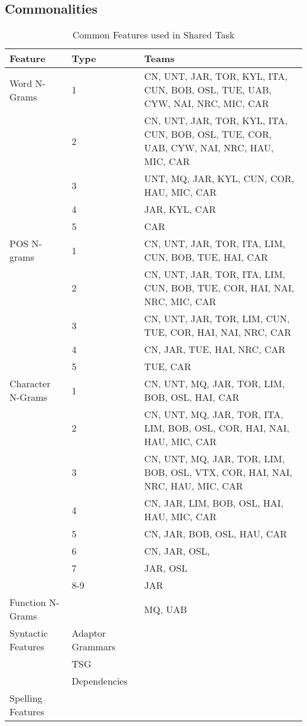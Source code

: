 \documentclass[11pt,letterpaper]{article}
\begin{document}
\subsection{Commonalities}


\begin{table*}[htbp]
\begin{small}
\begin{tabular}{|l|l|p{9.5cm}|}
\hline
{\bf Feature} & {\bf Type} & {\bf Teams} \\  \hline
Word N-Grams       & 1      & CN, UNT, JAR, TOR, KYL, ITA, CUN, BOB, OSL, TUE, UAB, CYW, NAI, NRC, MIC, CAR   \\ \hline
		   & 2      & CN, UNT, JAR, TOR, KYL, ITA, CUN, BOB, OSL, TUE, COR, UAB, CYW, NAI, NRC, HAU, MIC, CAR \\ \hline
                   & 3      & UNT, MQ, JAR, KYL, CUN, COR, HAU, MIC, CAR  \\ \hline
                   & 4      & JAR, KYL, CAR   \\ \hline
		   & 5      & CAR \\ \hline	
POS N-grams        & 1      & CN, UNT, JAR, TOR, ITA, LIM, CUN, BOB, TUE, HAI, CAR  \\ \hline
		   & 2      & CN, UNT, JAR, TOR, ITA, LIM, CUN, BOB, TUE, COR, HAI, NAI, NRC, MIC, CAR   \\ \hline
                   & 3      & CN, UNT, JAR, TOR, LIM, CUN, TUE, COR, HAI, NAI, NRC, CAR     \\ \hline
                   & 4      & CN, JAR, TUE, HAI, NRC, CAR    \\ \hline
                   & 5      & TUE, CAR \\ \hline
Character N-Grams  & 1      & CN, UNT, MQ, JAR, TOR, LIM, BOB, OSL, HAI, CAR  \\ \hline
                   & 2      & CN, UNT, MQ, JAR, TOR, ITA, LIM, BOB, OSL, COR, HAI, NAI, HAU, MIC, CAR  \\ \hline
                   & 3      & CN, UNT, MQ, JAR, TOR, LIM, BOB, OSL, VTX, COR, HAI, NAI, NRC, HAU, MIC, CAR \\ \hline
                   & 4      & CN, JAR, LIM, BOB, OSL, HAI, HAU, MIC, CAR \\ \hline
                   & 5      & CN, JAR, BOB, OSL, HAU, CAR  \\ \hline
                   & 6      & CN, JAR, OSL,   \\ \hline
	           & 7      & JAR, OSL \\ \hline
                   & 8-9    & JAR \\ \hline
Function N-Grams   &        & MQ, UAB  \\ \hline
Syntactic Features & Adaptor Grammars        &   \\ \hline
                   & TSG                 & \\ \hline
                   & Dependencies        & \\ \hline
Spelling Features  &        &   \\ \hline
\end{tabular}
\end{small}
\caption{Common Features used in Shared Task\label{tab:common-features}}
\end{table*}
\end{document}

